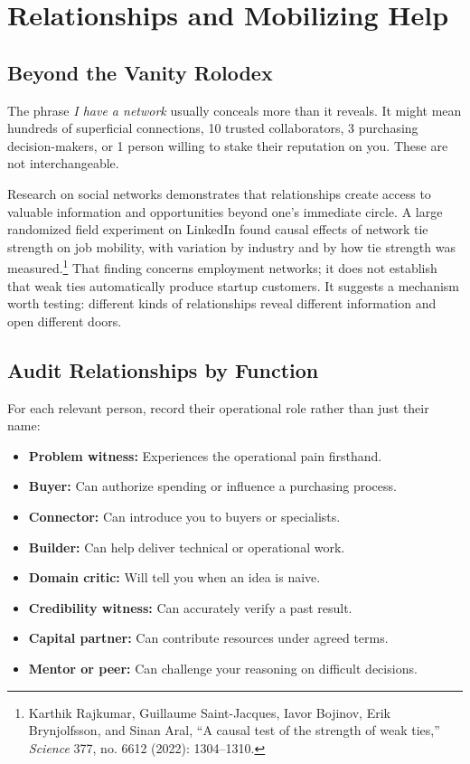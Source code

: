 \section{Relationships and Mobilizing Help}

\subsection{Beyond the Vanity Rolodex}

The phrase \textit{I have a network} usually conceals more than it reveals. It might mean hundreds of superficial connections, 10 trusted collaborators, 3 purchasing decision-makers, or 1 person willing to stake their reputation on you. These are not interchangeable.

Research on social networks demonstrates that relationships create access to valuable information and opportunities beyond one's immediate circle. A large randomized field experiment on LinkedIn found causal effects of network tie strength on job mobility, with variation by industry and by how tie strength was measured.\footnote{Karthik Rajkumar, Guillaume Saint-Jacques, Iavor Bojinov, Erik Brynjolfsson, and Sinan Aral, ``A causal test of the strength of weak ties,'' \textit{Science} 377, no. 6612 (2022): 1304--1310.} That finding concerns employment networks; it does not establish that weak ties automatically produce startup customers. It suggests a mechanism worth testing: different kinds of relationships reveal different information and open different doors.

\subsection{Audit Relationships by Function}

For each relevant person, record their operational role rather than just their name:

\begin{itemize}[leftmargin=11pt,itemsep=1.5pt,topsep=1.5pt,parsep=0pt]
  \item \textbf{Problem witness:} Experiences the operational pain firsthand.
  \item \textbf{Buyer:} Can authorize spending or influence a purchasing process.
  \item \textbf{Connector:} Can introduce you to buyers or specialists.
  \item \textbf{Builder:} Can help deliver technical or operational work.
  \item \textbf{Domain critic:} Will tell you when an idea is naive.
  \item \textbf{Credibility witness:} Can accurately verify a past result.
  \item \textbf{Capital partner:} Can contribute resources under agreed terms.
  \item \textbf{Mentor or peer:} Can challenge your reasoning on difficult decisions.
\end{itemize}

